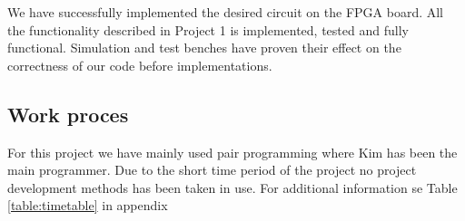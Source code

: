 We have successfully implemented the desired circuit on the FPGA board. 
All the functionality described in Project 1 is implemented, tested and fully functional.
Simulation and test benches have proven their effect on the correctness of our code before implementations.

\subsection{Work proces} 
For this project we have mainly used pair programming where Kim has been the main programmer.
Due to the short time period of the project no project development methods has been taken in use.
For additional information se Table \ref{table:timetable} in appendix 